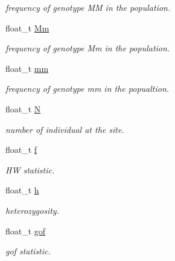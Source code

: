\begin{DoxyCompactItemize}
\begin{DoxyCompactList}\small\item\em frequency of genotype M\-M in the population. \end{DoxyCompactList}\item 
\hypertarget{classallele__stat_aa50477ab7486d98a4643a9c52df1fb1e}{float\-\_\-t \hyperlink{classallele__stat_aa50477ab7486d98a4643a9c52df1fb1e}{Mm}}\label{classallele__stat_aa50477ab7486d98a4643a9c52df1fb1e}

\begin{DoxyCompactList}\small\item\em frequency of genotype Mm in the population. \end{DoxyCompactList}\item 
\hypertarget{classallele__stat_abe634b1131800ee5b295228b83934ac5}{float\-\_\-t \hyperlink{classallele__stat_abe634b1131800ee5b295228b83934ac5}{mm}}\label{classallele__stat_abe634b1131800ee5b295228b83934ac5}

\begin{DoxyCompactList}\small\item\em frequency of genotype mm in the popualtion. \end{DoxyCompactList}\item 
\hypertarget{classallele__stat_a1b15b958fe6a07fbd77524f2a86c958a}{float\-\_\-t \hyperlink{classallele__stat_a1b15b958fe6a07fbd77524f2a86c958a}{N}}\label{classallele__stat_a1b15b958fe6a07fbd77524f2a86c958a}

\begin{DoxyCompactList}\small\item\em number of individual at the site. \end{DoxyCompactList}\item 
\hypertarget{classallele__stat_a4541dd92614e9f3f58b3014d1af957f6}{float\-\_\-t \hyperlink{classallele__stat_a4541dd92614e9f3f58b3014d1af957f6}{f}}\label{classallele__stat_a4541dd92614e9f3f58b3014d1af957f6}

\begin{DoxyCompactList}\small\item\em H\-W statistic. \end{DoxyCompactList}\item 
\hypertarget{classallele__stat_abbe9258202898fce4f1e2331feb1ad3d}{float\-\_\-t \hyperlink{classallele__stat_abbe9258202898fce4f1e2331feb1ad3d}{h}}\label{classallele__stat_abbe9258202898fce4f1e2331feb1ad3d}

\begin{DoxyCompactList}\small\item\em heterozygosity. \end{DoxyCompactList}\item 
\hypertarget{classallele__stat_a84c271c57a619f6ea3e520f44e446361}{float\-\_\-t \hyperlink{classallele__stat_a84c271c57a619f6ea3e520f44e446361}{gof}}\label{classallele__stat_a84c271c57a619f6ea3e520f44e446361}

\begin{DoxyCompactList}\small\item\em gof statistic. \end{DoxyCompactList}\end{DoxyCompactItemize}
